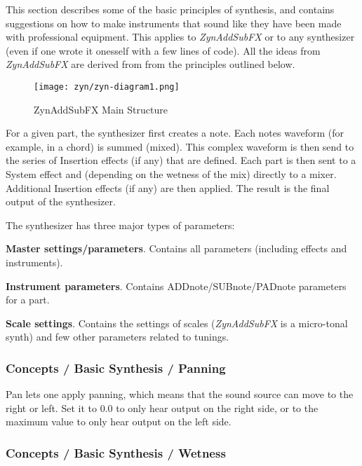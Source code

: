   This section describes some of the basic principles of synthesis,
   and contains suggestions on
   how to make instruments that sound like they have been made with
   professional equipment. This applies to \textsl{ZynAddSubFX} or to any
   synthesizer (even if one wrote it onesself with a few lines of code). All
   the ideas from \textsl{ZynAddSubFX} are derived from from the principles
   outlined below.

\begin{figure}[H]
   \centering 
   \texttt{[image: zyn/zyn-diagram1.png]}
   \caption{ZynAddSubFX Main Structure}
   \label{fig:zynaddsubfx_main_structure}
\end{figure}

   For a given part, the synthesizer first creates a note.  Each notes
   waveform (for example, in a chord) is summed (mixed).  This complex
   waveform is then send to the series of Insertion effects (if any) that
   are defined.  Each part is then sent to a System effect and (depending on
   the wetness of the mix) directly to a mixer.  Additional Insertion
   effects (if any) are then applied.  The result is the final output of the
   synthesizer.

   The synthesizer has three major types of parameters: 

   \begin{enumber}
      \item \textbf{Master settings/parameters}.
         Contains all parameters (including effects and instruments).
      \item \textbf{Instrument parameters}.
         Contains ADDnote/SUBnote/PADnote parameters for a part.
      \item \textbf{Scale settings}.
         Contains the settings of scales (\textsl{ZynAddSubFX}
         is a micro-tonal synth) and few other parameters related to
         tunings.
   \end{enumber}

\subsubsection{Concepts / Basic Synthesis / Panning}
\label{subsubsec:concepts_basics_panning}

   Pan lets one apply panning, which means that the sound source can move to
   the right or left. Set it to 0.0 to only hear output on the right side, or
   to the maximum value to only hear output on the left side.

\subsubsection{Concepts / Basic Synthesis / Wetness}
\label{subsubsec:concepts_basics_wetness}

